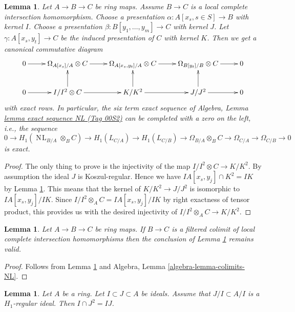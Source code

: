 \documentclass{amsart}
\theoremstyle{plain}
\newtheorem{lemma}[subsection]{Lemma}
\theoremstyle{definition}
\theoremstyle{remark}
\numberwithin{equation}{subsection}
\def\NL{\mathop{N\!L}\nolimits}
\begin{document}
\begin{lemma}
\label{lemma-transitive-lci-at-end}
Let $A \to B \to C$ be ring maps. Assume $B \to C$ is a local complete
intersection homomorphism. Choose a presentation
$\alpha : A[x_s, s \in S] \to B$ with kernel $I$. Choose a presentation
$\beta : B[y_1, \ldots, y_m] \to C$ with kernel $J$. Let
$\gamma : A[x_s, y_t] \to C$ be the induced presentation of $C$ with kernel
$K$. Then we get a canonical commutative diagram
$$
\xymatrix{
0 \ar[r] &
\Omega_{A[x_s]/A} \otimes C \ar[r] &
\Omega_{A[x_s, y_t]/A} \otimes C \ar[r] &
\Omega_{B[y_t]/B} \otimes C \ar[r] &
0 \\
0 \ar[r] &
I/I^2 \otimes C \ar[r] \ar[u] &
K/K^2 \ar[r] \ar[u] &
J/J^2 \ar[r] \ar[u] &
0
}
$$
with exact rows. In particular, the six term exact sequence of
Algebra, Lemma \href{https://stacks.math.columbia.edu/tag/00S2}{lemma exact sequence NL (Tag 00S2)}
can be completed with a zero on the left, i.e., the sequence
$$
0 \to H_1(\NL_{B/A} \otimes_B C) \to
H_1(L_{C/A}) \to
H_1(L_{C/B}) \to
\Omega_{B/A} \otimes_B C \to
\Omega_{C/A} \to
\Omega_{C/B} \to 0
$$
is exact.
\end{lemma}

\begin{proof}
The only thing to prove is the injectivity of the map
$I/I^2 \otimes C \to K/K^2$.
By assumption the ideal $J$ is Koszul-regular.
Hence we have $IA[x_s, y_j] \cap K^2 = IK$ by
Lemma \ref{lemma-conormal-sequence-H1-regular-ideal}.
This means that the kernel of $K/K^2 \to J/J^2$ is
isomorphic to $IA[x_s, y_j]/IK$. Since
$I/I^2 \otimes_A C = IA[x_s, y_j]/IK$ by right exactness
of tensor product, this provides us with the desired injectivity of
$I/I^2 \otimes_A C \to K/K^2$.
\end{proof}


\begin{lemma}
\label{lemma-transitive-colimit-lci-at-end}
Let $A \to B \to C$ be ring maps.
If $B \to C$ is a filtered colimit of local complete intersection
homomorphisms then the conclusion of
Lemma \ref{lemma-transitive-lci-at-end}
remains valid.
\end{lemma}

\begin{proof}
Follows from
Lemma \ref{lemma-transitive-lci-at-end}
and
Algebra, Lemma \ref{algebra-lemma-colimits-NL}.
\end{proof}


\begin{lemma}
\label{lemma-conormal-sequence-H1-regular-ideal}
Let $A$ be a ring. Let $I \subset J \subset A$ be ideals.
Assume that $J/I \subset A/I$ is a $H_1$-regular ideal.
Then $I \cap J^2 = IJ$.
\end{lemma}
\end{document}

